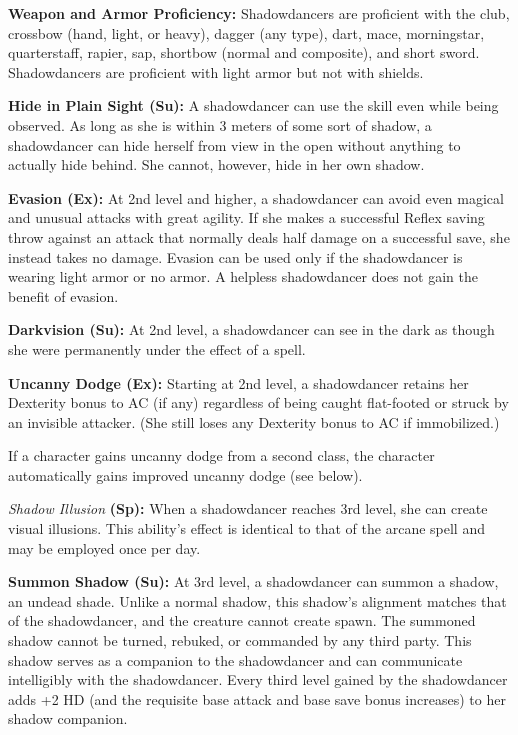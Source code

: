 {
\textbf{Weapon and Armor Proficiency:} Shadowdancers are proficient with the club, crossbow (hand, light, or heavy), dagger (any type), dart, mace, morningstar, quarterstaff, rapier, sap, shortbow (normal and composite), and short sword. Shadowdancers are proficient with light armor but not with shields.

\textbf{Hide in Plain Sight (Su):} A shadowdancer can use the  skill even while being observed. As long as she is within 3 meters of some sort of shadow, a shadowdancer can hide herself from view in the open without anything to actually hide behind. She cannot, however, hide in her own shadow.

\textbf{Evasion (Ex):} At 2nd level and higher, a shadowdancer can avoid even magical and unusual attacks with great agility. If she makes a successful Reflex saving throw against an attack that normally deals half damage on a successful save, she instead takes no damage. Evasion can be used only if the shadowdancer is wearing light armor or no armor. A helpless shadowdancer does not gain the benefit of evasion.

\textbf{Darkvision (Su):} At 2nd level, a shadowdancer can see in the dark as though she were permanently under the effect of a  spell.

\textbf{Uncanny Dodge (Ex):} Starting at 2nd level, a shadowdancer retains her Dexterity bonus to AC (if any) regardless of being caught flat-footed or struck by an invisible attacker. (She still loses any Dexterity bonus to AC if immobilized.)

If a character gains uncanny dodge from a second class, the character automatically gains improved uncanny dodge (see below).

\textit{Shadow Illusion} \textbf{(Sp):} When a shadowdancer reaches 3rd level, she can create visual illusions. This ability's effect is identical to that of the arcane spell  and may be employed once per day.

\textbf{Summon Shadow (Su):} At 3rd level, a shadowdancer can summon a shadow, an undead shade. Unlike a normal shadow, this shadow's alignment matches that of the shadowdancer, and the creature cannot create spawn. The summoned shadow cannot be turned, rebuked, or commanded by any third party. This shadow serves as a companion to the shadowdancer and can communicate intelligibly with the shadowdancer. Every third level gained by the shadowdancer adds +2 HD (and the requisite base attack and base save bonus increases) to her shadow companion.

}
